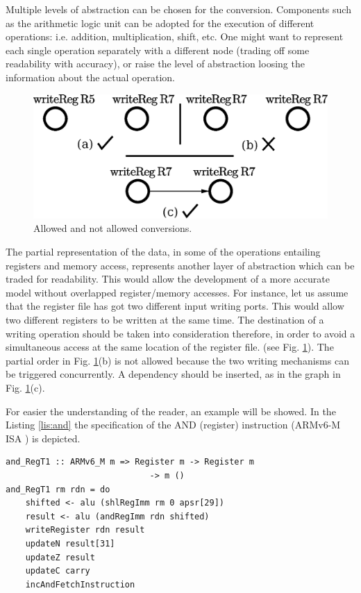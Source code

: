 \documentclass[conference]{IEEEtran}
\begin{document}
Multiple levels of abstraction can be chosen for the conversion. Components such as the
arithmetic logic unit can be adopted for the execution of
different operations: i.e. addition, multiplication, shift, etc. One might want to represent
each single operation separately with a different node 
(trading off some readability with accuracy), or raise the
level of abstraction loosing the information about the actual operation.

\begin{figure}[ht!]
\begin{center}
	\includegraphics[width=\linewidth]{IMG/depPO.eps}
	\caption{Allowed and not allowed conversions.}
	\label{fig:depPO}
\end{center}
\end{figure}

The partial representation of the data, in some of the operations entailing registers and
memory access, represents another layer of abstraction which can be traded for readability.
This would allow the development of a more accurate model without overlapped register/memory
accesses. For instance, let us assume that the register file has got two different input
writing ports. This would allow two different registers to be written at the same time.
The destination of a writing operation should be taken into consideration therefore,
in order to avoid a simultaneous access at the same location of the register file.
(see Fig. \ref{fig:depPO}). The partial order in Fig. \ref{fig:depPO}(b) is not allowed
because the two writing mechanisms can be triggered concurrently.
A dependency should be inserted, as in the graph in Fig. \ref{fig:depPO}(c).

For easier the understanding of the reader, an example will be showed. In the Listing
\ref{lis:and} the specification of the AND (register) instruction (ARMv6-M ISA
\cite{armManual}) is depicted.\\

\begin{lstlisting}[caption=AND (register) instruction - Haskell-based specification,
frame=single, label=lis:and]
and_RegT1 :: ARMv6_M m => Register m -> Register m 
			 				 -> m ()
and_RegT1 rm rdn = do
    shifted <- alu (shlRegImm rm 0 apsr[29])
    result <- alu (andRegImm rdn shifted)
    writeRegister rdn result
    updateN result[31]
    updateZ result
    updateC carry
    incAndFetchInstruction
\end{lstlisting}
\end{document}
